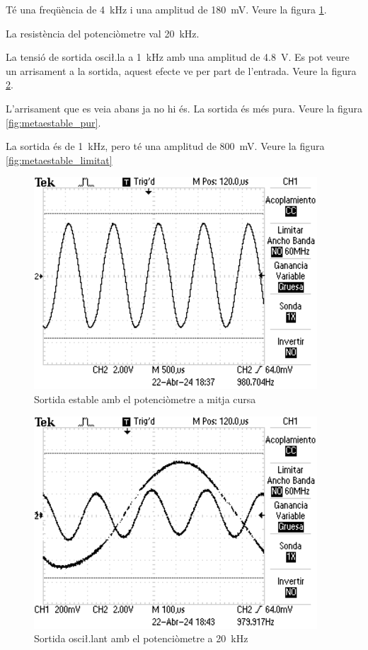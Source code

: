 \documentclass[catalan, a4paper, nobib]{tufte-handout}
\begin{document}
 Té una freqüència de \qty{4}{\kilo\hertz} i una amplitud de \qty{180}{\milli\volt}. Veure la figura \ref{fig:estable}.

 La resistència del potenciòmetre val \qty{20}{\kilo\hertz}.

 La tensió de sortida osci\l.la a \qty{1}{\kilo\hertz} amb una amplitud de \qty{4.8}{\volt}. Es pot veure un arrisament a la sortida, aquest efecte ve per part de l'entrada. Veure la figura \ref{fig:metaestable}.

 L'arrisament que es veia abans ja no hi és. La sortida és més pura. Veure la figura \ref{fig:metaestable_pur}.

 La sortida és de \qty{1}{\kilo\hertz}, pero té una amplitud de \qty{800}{\milli\volt}. Veure la figura \ref{fig:metaestable_limitat}

\newpage

\begin{figure}[!h]
    \begin{center}
        \includegraphics[width=400px]{L7_1.png}
    \end{center}
    \caption{Sortida estable amb el potenciòmetre a mitja cursa}
    \label{fig:estable}
\end{figure}

\begin{figure}[!h]
    \begin{center}
        \includegraphics[width=400px]{L7_2.png}
    \end{center}
    \caption{Sortida osci\l.lant amb el potenciòmetre a \qty{20}{\kilo\hertz}}
    \label{fig:metaestable}
\end{figure}
\end{document}
